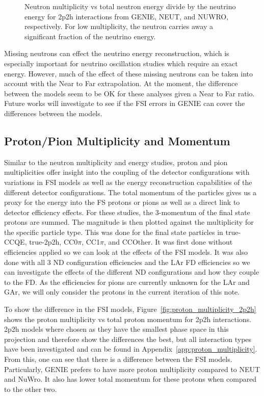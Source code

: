 \documentclass[12pt]{article}
\begin{document}
\begin{figure}
\begin{subfigure}[b]{0.32\textwidth}
\end{subfigure}
\caption{Neutron multiplicity vs total neutron energy divide by the neutrino energy for 2p2h interactions from GENIE, NEUT, and NUWRO, respectively.  For low multiplicity, the neutron carries away a significant fraction of the neutrino energy.} 
\label{fig:Neutron_multi_ene_enu_2p2h_ND}
\end{figure}
\FloatBarrier

Missing neutrons can effect the neutrino energy reconstruction, which is especially important for neutrino oscillation studies which require an exact energy.
However, much of the effect of these missing neutrons can be taken into account with the Near to Far extrapolation.
At the moment, the difference between the models seem to be OK for these analyses given a Near to Far ratio.
Future works will investigate to see if the FSI errors in GENIE can cover the differences between the models. 
 

\subsection{Proton/Pion Multiplicity and Momentum}
\label{subsec:Particle_multiplicities_momentum}

Similar to the neutron multiplicity and energy studies, proton and pion multiplicities offer insight into the coupling of the detector configurations with variations in FSI models as well as the energy reconstruction capabilities of the different detector configurations. 
The total momentum of the particles gives us a proxy for the energy into the FS protons or pions as well as a direct link to detector efficiency effects.  
For these studies, the 3-momentum of the final state protons are summed. 
The magnitude is then plotted against the multiplicity for the specific particle type. 
This was done for the final state particles in true-CCQE, true-2p2h, CC0$\pi$, CC1$\pi$, and CCOther. It was first done without efficiencies applied so we can look at the effects of the FSI models. It was also done with all 3 ND configuration efficiencies and the LAr FD efficiencies so we can investigate the effects of the different ND configurations and how they couple to the FD.
As the efficiencies for pions are currently unknown for the LAr and GAr, we will only consider the protons in the current iteration of this note. 

To show the difference in the FSI models, Figure~\ref{fig:proton_multiplicity_2p2h} shows the proton multiplicity vs total proton momentum for 2p2h interactions. 
2p2h models where chosen as they have the smallest phase space in this projection and therefore show the differences the best, but all interaction types have been investigated and can be found in Appendix~\ref{app:proton_multiplicity}.
From this, one can see that there is a difference between the FSI models.  
Particularly, GENIE prefers to have more proton multiplicity compared to NEUT and NuWro.
It also has lower total momentum for these protons when compared to the other two.
 
\end{document}
